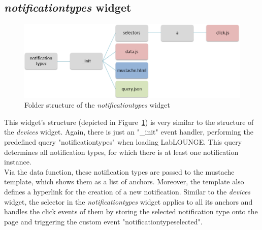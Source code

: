 \subsection{\emph{notificationtypes} widget}
\label{couchapp:labloungedeveloper:notificationtypes}
\begin{figure}[h!]
\centering
\includegraphics[width=1.0\columnwidth]{images/labloungestructurenotificationtypes.png}
\caption{Folder structure of the \emph{notificationtypes} widget}
\label{img:structurenotificationtypes}
\end{figure}
This widget's structure (depicted in Figure~\ref{img:structurenotificationtypes}) is very similar to the structure of the \emph{devices} widget. Again, there is just an "\_init" event handler, performing the predefined query "notificationtypes" when loading LabLOUNGE. This query determines all notification types, for which there is at least one notification instance.\\
Via the data function, these notification types are passed to the mustache template, which shows them as a list of anchors. Moreover, the template also defines a hyperlink for the creation of a new notification. Similar to the \emph{devices} widget, the selector in the \emph{notificationtypes} widget applies to all its anchors and handles the click events of them by storing the selected notification type onto the page and triggering the custom event "notificationtypeselected".
